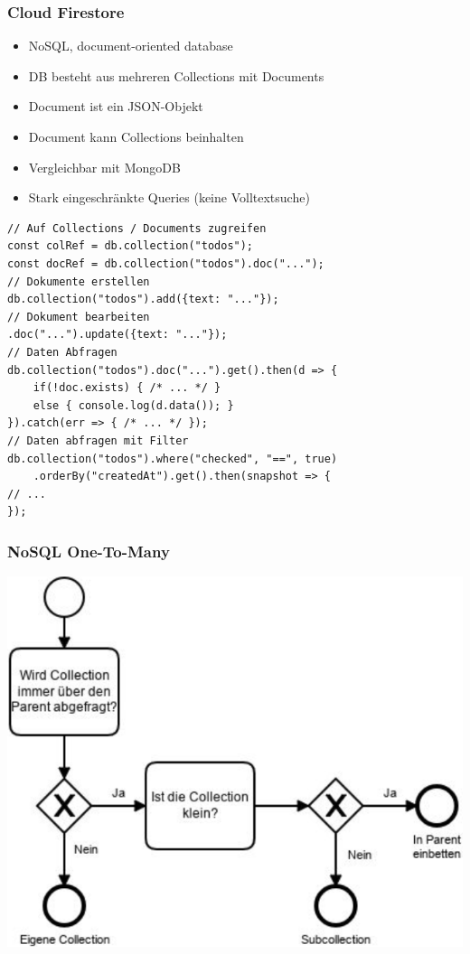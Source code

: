 \subsubsection{Cloud Firestore}
\begin{itemize}
    \item NoSQL, document-oriented database
    \item DB besteht aus mehreren Collections mit Documents
    \item Document ist ein JSON-Objekt
    \item Document kann Collections beinhalten
    \item Vergleichbar mit MongoDB
    \item Stark eingeschränkte Queries (keine Volltextsuche)
\end{itemize}
\begin{lstlisting}
// Auf Collections / Documents zugreifen
const colRef = db.collection("todos");
const docRef = db.collection("todos").doc("...");
// Dokumente erstellen
db.collection("todos").add({text: "..."});
// Dokument bearbeiten
.doc("...").update({text: "..."});
// Daten Abfragen
db.collection("todos").doc("...").get().then(d => {
    if(!doc.exists) { /* ... */ }
    else { console.log(d.data()); }
}).catch(err => { /* ... */ });
// Daten abfragen mit Filter
db.collection("todos").where("checked", "==", true)
    .orderBy("createdAt").get().then(snapshot => {
// ...
});
\end{lstlisting}

\subsubsection{NoSQL One-To-Many}
\includegraphics[width=0.6\linewidth]{img/nosql_one_to_many.png}

